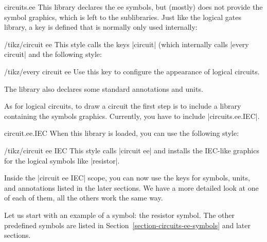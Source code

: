 \begin{tikzlibrary}{circuits.ee}
    This library declares the ee symbols, but (mostly) does not provide the
    symbol graphics, which is left to the sublibraries. Just like the logical
    gates library, a key is defined that is normally only used internally:
    \begin{key}{/tikz/circuit ee}
        This style calls the keys |circuit| (which internally calls
        |every circuit| and the following style:
        \begin{stylekey}{/tikz/every circuit ee}
            Use this key to configure the appearance of logical circuits.
        \end{stylekey}
    \end{key}

    The library also declares some standard annotations and units.
\end{tikzlibrary}

As for logical circuits, to draw a circuit the first step is to include a
library containing the symbols graphics. Currently, you have to include
|circuits.ee.IEC|.

\begin{tikzlibrary}{circuit.ee.IEC}
    When this library is loaded, you can use the following style:
    \begin{key}{/tikz/circuit ee IEC}
        This style calls |circuit ee| and installs the IEC-like graphics for
        the logical symbols like |resistor|.
    \end{key}
\end{tikzlibrary}

Inside the |circuit ee IEC| scope, you can now use the keys for symbols, units,
and annotations listed in the later sections. We have a more detailed look at
one of each of them, all the others work the same way.

Let us start with an example of a symbol: the resistor symbol. The other
predefined symbols are listed in Section~\ref{section-circuits-ee-symbols} and
later sections.

